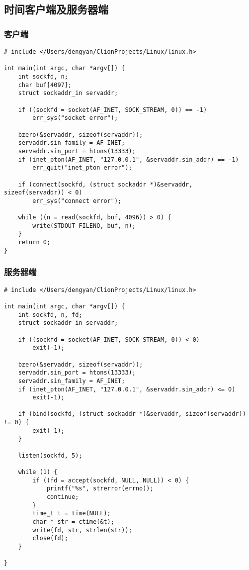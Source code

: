 \subsection{时间客户端及服务器端}
\subsubsection{客户端}
\begin{verbatim}
# include </Users/dengyan/ClionProjects/Linux/linux.h>

int main(int argc, char *argv[]) {
    int sockfd, n;
    char buf[4097];
    struct sockaddr_in servaddr;

    if ((sockfd = socket(AF_INET, SOCK_STREAM, 0)) == -1)
        err_sys("socket error");

    bzero(&servaddr, sizeof(servaddr));
    servaddr.sin_family = AF_INET;
    servaddr.sin_port = htons(13333);
    if (inet_pton(AF_INET, "127.0.0.1", &servaddr.sin_addr) == -1)
        err_quit("inet_pton error");

    if (connect(sockfd, (struct sockaddr *)&servaddr, sizeof(servaddr)) < 0)
        err_sys("connect error");

    while ((n = read(sockfd, buf, 4096)) > 0) {
        write(STDOUT_FILENO, buf, n);
    }
    return 0;
}
\end{verbatim}
\subsubsection{服务器端}
\begin{verbatim}
# include </Users/dengyan/ClionProjects/Linux/linux.h>

int main(int argc, char *argv[]) {
    int sockfd, n, fd;
    struct sockaddr_in servaddr;

    if ((sockfd = socket(AF_INET, SOCK_STREAM, 0)) < 0)
        exit(-1);

    bzero(&servaddr, sizeof(servaddr));
    servaddr.sin_port = htons(13333);
    servaddr.sin_family = AF_INET;
    if (inet_pton(AF_INET, "127.0.0.1", &servaddr.sin_addr) <= 0)
        exit(-1);

    if (bind(sockfd, (struct sockaddr *)&servaddr, sizeof(servaddr)) != 0) {
        exit(-1);
    }

    listen(sockfd, 5);

    while (1) {
        if ((fd = accept(sockfd, NULL, NULL)) < 0) {
            printf("%s", strerror(errno));
            continue;
        }
        time_t t = time(NULL);
        char * str = ctime(&t);
        write(fd, str, strlen(str));
        close(fd);
    }

}
\end{verbatim}
\newpage


